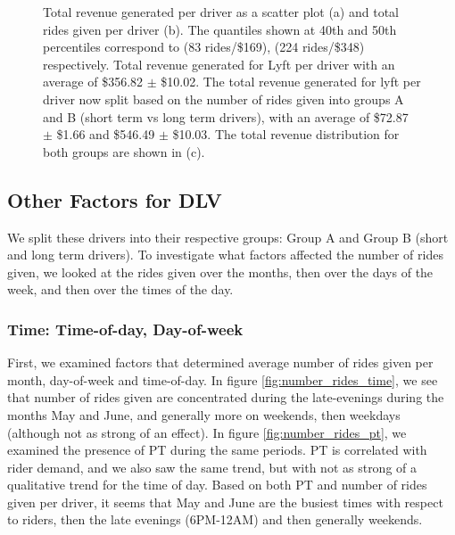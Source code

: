 \documentclass{report}
\begin{document}
\begin{figure}[!htb]
\begin{subfigure}[t]{0.32\textwidth}
				\caption{}
			\end{subfigure}
			\caption{Total revenue generated per driver as a scatter plot (a) and total rides given per driver (b). The quantiles shown at 40th and 50th percentiles correspond to (83 rides/\$169), (224 rides/\$348) respectively. Total revenue generated for Lyft per driver with an average of \$356.82 $\pm$ \$10.02. The total revenue generated for lyft per driver now split based on the number of rides given into groups A and B (short term vs long term drivers), with an average of \$72.87 $\pm$ \$1.66 and \$546.49 $\pm$ \$10.03. The total revenue distribution for both groups are shown in (c).}
			\label{fig:driver_rev_distribution}
		\end{figure} 

	\subsection{Other Factors for DLV}

		We split these drivers into their respective groups: Group A and Group B (short and long term drivers). To investigate what factors affected the number of rides given, we looked at the rides given over the months, then over the days of the week, and then over the times of the day.

		\subsubsection{Time: Time-of-day, Day-of-week}
			First, we examined factors that determined average number of rides given per month, day-of-week and time-of-day. In figure \ref{fig:number_rides_time}, we see that number of rides given are concentrated during the late-evenings during the months May and June, and generally more on weekends, then weekdays (although not as strong of an effect). In figure \ref{fig:number_rides_pt}, we examined the presence of PT during the same periods. PT is correlated with rider demand, and we also saw the same trend, but with not as strong of a qualitative trend for the time of day. Based on both PT and number of rides given per driver, it seems that May and June are the busiest times with respect to riders, then the late evenings (6PM-12AM) and then generally weekends.
\end{document}
